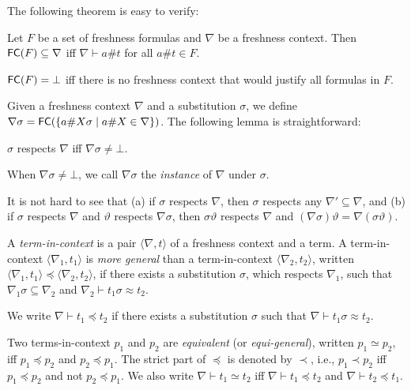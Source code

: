 \documentclass{llncs}
\newcommand{\np}[2]{\langle #1, \allowbreak #2\rangle}
\newcommand{\fe}{{\sf FC}}
\begin{document}
The following theorem is easy to verify:


\begin{theorem}
  \label{thm:properties:of:FC}
   Let $F$ be a set of freshness formulas and $\nabla$ be a freshness context. Then ${\fe}(F) \subseteq \nabla$ iff $\nabla\vdash a\# t$ for all ${ a\# t}\in F$.
\end{theorem}



\begin{corollary}
  \label{thm:properties:of:FC:2}
   ${\fe}(F)=\bot$ iff there is no freshness context that would justify all formulas in $F$.
\end{corollary}

Given a freshness context $\nabla$ and a substitution $\sigma$, we
define $\nabla\sigma = {\fe}(\allowbreak \{ a\# X\sigma \mid a\# X\in \nabla\})$. The following lemma is straightforward:

\begin{lemma}
  \label{lemma:fc:respects:context}
  $\sigma$ respects $\nabla$ iff $\nabla\sigma\neq \bot$.
\end{lemma}

When $\nabla\sigma\neq \bot$, we call $\nabla\sigma$ the
\emph{instance} of $\nabla$ under $\sigma$.

It is not hard to see that (a)  if $\sigma$ respects $\nabla$, then $\sigma$ respects any $\nabla'\subseteq \nabla$, and (b) if $\sigma$ respects $\nabla$ and $\vartheta$ respects $\nabla\sigma$, then $\sigma\vartheta$ respects $\nabla$ and $(\nabla\sigma)\vartheta=\nabla(\sigma\vartheta)$.

\begin{definition}
A \emph{term-in-context} is a pair $\np{\nabla}{t}$ of a freshness
context and a term. 
A term-in-context $\np{\nabla_1}{t_1}$ is \emph{more
  general} than a term-in-context $\np{\nabla_2}{t_2}$, written
$\np{\nabla_1}{t_1} \preceq \np{\nabla_2}{t_2}$, if there exists a
substitution $\sigma$, which respects $\nabla_1$, such that $
\nabla_1\sigma \subseteq \nabla_2$ and $ \nabla_2\vdash t_1\sigma
\approx t_2$. 

We write $\nabla \vdash t_1 \preceq t_2$ if there exists a substitution $\sigma$ such that $\nabla \vdash t_1\sigma \approx t_2$.

Two terms-in-context $p_1$ and $p_2$ are \emph{equivalent} (or
\emph{equi-general}), written $p_1\simeq p_2$, iff $p_1 \preceq p_2$
and $p_2 \preceq p_1$. The strict part of $\preceq$ is denoted by $\prec$, i.e.,
$p_1\prec p_2$ iff $p_1 \preceq p_2$ and not $p_2 \preceq p_1$.
We also write $\nabla \vdash t_1 \simeq t_2$ iff $\nabla \vdash t_1 \preceq t_2$ and $\nabla \vdash t_2 \preceq t_1$.
\end{definition}
\end{document}
